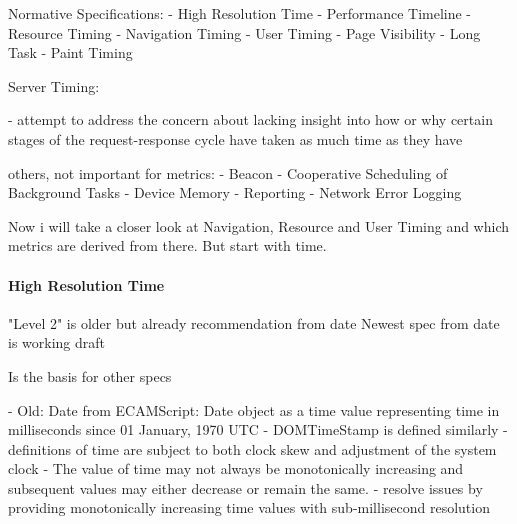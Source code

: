 
Normative Specifications:
- High Resolution Time
- Performance Timeline
- Resource Timing
- Navigation Timing
- User Timing
- Page Visibility
- Long Task
- Paint Timing


Server Timing:

- attempt to address the concern about lacking insight into how or why certain stages of the request-response cycle have taken as much time as they have


others, not important for metrics:
- Beacon
- Cooperative Scheduling of Background Tasks
- Device Memory
- Reporting
- Network Error Logging






Now i will take a closer look at Navigation, Resource and User Timing and which metrics are derived from there.
But start with time.






\paragraph{High Resolution Time}


"Level 2" is older but already recommendation from date %
Newest spec from date is working draft %

Is the basis for other specs




- Old: Date from ECAMScript: Date object as a time value representing time in milliseconds since 01 January, 1970 UTC
-  DOMTimeStamp is defined similarly
- definitions of time are subject to both clock skew and adjustment of the system clock
- The value of time may not always be monotonically increasing and subsequent values may either decrease or remain the same.
- resolve issues by providing monotonically increasing time values with sub-millisecond resolution


